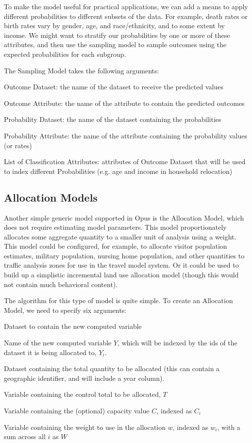 To make the model useful for practical applications, we can
add a means to apply different probabilities to different
subsets of the data.  For example, death rates or birth
rates vary by gender, age, and race/ethnicity, and to some
extent by income.  We might want to stratify our
probabilities by one or more of these attributes, and then
use the sampling model to sample outcomes using the expected
probabilities for each subgroup.

The Sampling Model takes the following arguments:

\squishlist
\item Outcome Dataset: the name of the dataset to receive the predicted values
\item Outcome Attribute: the name of the attribute to contain the predicted outcomes
\item Probability Dataset: the name of the dataset containing the probabilities
\item Probability Attribute: the name of the attribute
  containing the probability values (or rates)
\item List of Classification Attributes: attributes of
  Outcome Dataset that will be used to index different
  Probabilities (e.g. age and income in household
  relocation) \squishend

\subsection{Allocation Models}
%
\label{sec:components-allocation-model}
%
Another simple generic model supported in Opus is the
Allocation Model, which does not require estimating model
parameters.  This model proportionately allocates some
aggregate quantity to a smaller unit of analysis using a
weight.  This model could be configured, for example, to
allocate visitor population estimates, military population,
nursing home population, and other quantities to traffic
analysis zones for use in the travel model system.  Or it
could be used to build up a simplistic incremental land use
allocation model (though this would not contain much
behavioral content).

The algorithm for this type of model is quite simple.  To
create an Allocation Model, we need to specify six
arguments:

\squishlist
\item Dataset to contain the new computed variable
\item Name of the new computed variable $Y$, which will be
  indexed by the ids of the dataset it is being allocated
  to, $Y_i$.
\item Dataset containing the total quantity to be allocated
  (this can contain a geographic identifier, and will
  include a year column).
\item Variable containing the control total to be allocated,
  $T$
\item Variable containing the (optional) capacity value $C$,
  indexed as $C_i$
\item Variable containing the weight to use in the
  allocation $w$, indexed as $w_i$, with a sum across all
  $i$ as $W$ \squishend


